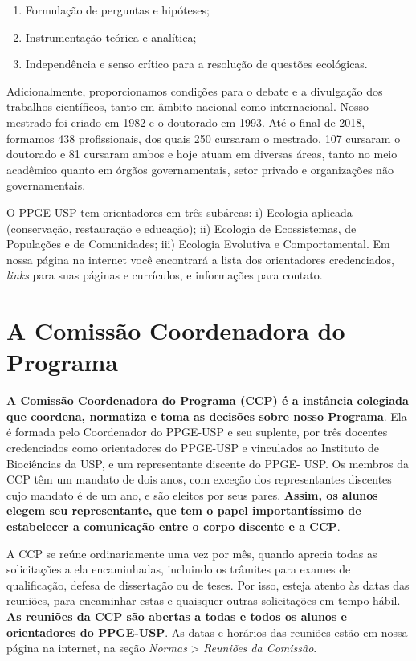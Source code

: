 \documentclass[twoside a4paper 12pt]{report}
\begin{document}
\begin{enumerate}
\item Formulação de perguntas e hipóteses;
\item Instrumentação teórica e analítica;
\item Independência e senso crítico para a resolução de questões ecológicas.
\end{enumerate}

Adicionalmente, proporcionamos condições para o debate e a divulgação
dos trabalhos científicos, tanto em âmbito nacional como internacional.
Nosso mestrado foi criado em 1982 e o doutorado em 1993. Até o final de
2018, formamos 438 profissionais, dos quais 250 cursaram o mestrado, 107
cursaram o doutorado e 81 cursaram ambos e hoje atuam em diversas áreas,
tanto no meio acadêmico quanto em órgãos governamentais, setor privado e
organizações não governamentais.

O PPGE-USP tem orientadores em três subáreas: i) Ecologia aplicada
(conservação, restauração e educação); ii) Ecologia de Ecossistemas, de
Populações e de Comunidades; iii) Ecologia Evolutiva e Comportamental.
Em nossa página na internet você encontrará a lista dos orientadores
credenciados, \emph{links} para suas páginas e currículos, e informações
para contato.


\section{A Comissão Coordenadora do Programa}
\label{sec:CCP}

\textbf{A Comissão Coordenadora do Programa (CCP) é a instância
colegiada que coordena, normatiza e toma as decisões sobre nosso
Programa}. Ela é formada pelo Coordenador do PPGE-USP e seu suplente,
por três docentes credenciados como orientadores do PPGE-USP e
vinculados ao Instituto de Biociências da USP, e um representante
discente do PPGE- USP. Os membros da CCP têm um mandato de dois anos,
com exceção dos representantes discentes cujo mandato é de um ano, e são
eleitos por seus pares. \textbf{Assim, os alunos elegem seu
representante, que tem o papel importantíssimo de estabelecer a
comunicação entre o corpo discente e a CCP}.

A CCP se reúne ordinariamente uma vez por mês, quando aprecia todas as
solicitações a ela encaminhadas, incluindo os trâmites para exames de
qualificação, defesa de dissertação ou de teses. Por isso, esteja atento
às datas das reuniões, para encaminhar estas e quaisquer outras
solicitações em tempo hábil. \textbf{As reuniões da CCP são abertas a
todas e todos os alunos e orientadores do PPGE-USP}. As datas e horários
das reuniões estão em nossa página na internet, na seção \emph{Normas}
\textgreater{} \emph{Reuniões da Comissão}.
\end{document}
